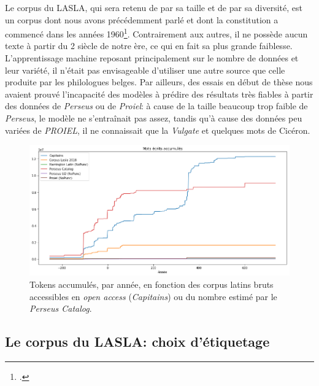 Le corpus du LASLA, qui sera retenu de par sa taille et de par sa diversité, est un corpus dont nous avons précédemment parlé et dont la constitution a commencé dans les années 1960\footcites{delatte_laboratoire_1961}{BodsonCodification1966}. Contrairement aux autres, il ne possède aucun texte à partir du 2 siècle de notre ère, ce qui en fait sa plus grande faiblesse. L'apprentissage machine reposant principalement sur le nombre de données et leur variété, il n'était pas envisageable d'utiliser une autre source que celle produite par les philologues belges. Par ailleurs, des essais en début de thèse nous avaient prouvé l'incapacité des modèles à prédire des résultats très fiables à partir des données de \textit{Perseus} ou de \textit{Proiel}: à cause de la taille beaucoup trop faible de \textit{Perseus}, le modèle ne s'entraînait pas assez, tandis qu'à cause des données peu variées de \textit{PROIEL}, il ne connaissait que la \textit{Vulgate} et quelques mots de Cicéron.

\begin{figure}
    \includegraphics[width=\linewidth]{results/lemmatisation/corpus/tokens_per_year.png}
    \caption{Tokens accumulés, par année, en fonction des corpus latins bruts accessibles en \textit{open access} (\textit{Capitains}) ou du nombre estimé  par le \textit{Perseus Catalog}.}
    \label{fig:lemmatisation:corpus-entrainement}
\end{figure}

\subsection{Le corpus du LASLA: choix d'étiquetage}

